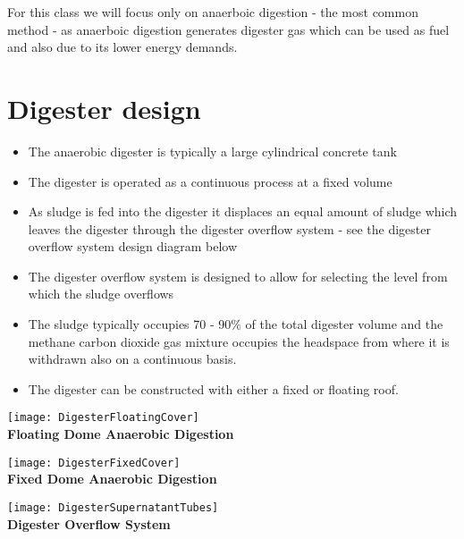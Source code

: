         For this class we will focus only on anaerboic digestion - the most common method - as anaerboic digestion generates digester gas which can be used as fuel and also due to its lower energy demands.
        \vspace{3mm}
\section{Digester design}
            
            \begin{itemize}
                \item The anaerobic digester is typically a large cylindrical concrete tank
                \item The digester is operated as a continuous process at a fixed volume
                \item As sludge is fed into the digester it displaces an equal amount of sludge which leaves the digester through the digester overflow system - see the digester overflow system design diagram below
                \item The digester overflow system is designed to allow for selecting the level from which the sludge overflows
                \item The sludge typically occupies 70 - 90\% of the total digester volume and the methane carbon dioxide gas mixture occupies the headspace from where it is withdrawn also on a continuous basis.
                \item The digester can be constructed with either a fixed or floating roof.
            \end{itemize}
                \begin{center}
                \texttt{[image: DigesterFloatingCover]}\\
                \textbf{Floating Dome Anaerobic Digestion}\\
                \end{center}

                \begin{center}
                \texttt{[image: DigesterFixedCover]}\\
                \textbf{Fixed Dome Anaerobic Digestion}\\
                \end{center}

                \begin{center}
                \texttt{[image: DigesterSupernatantTubes]}\\
                \textbf{Digester Overflow System}\\
                \end{center}


